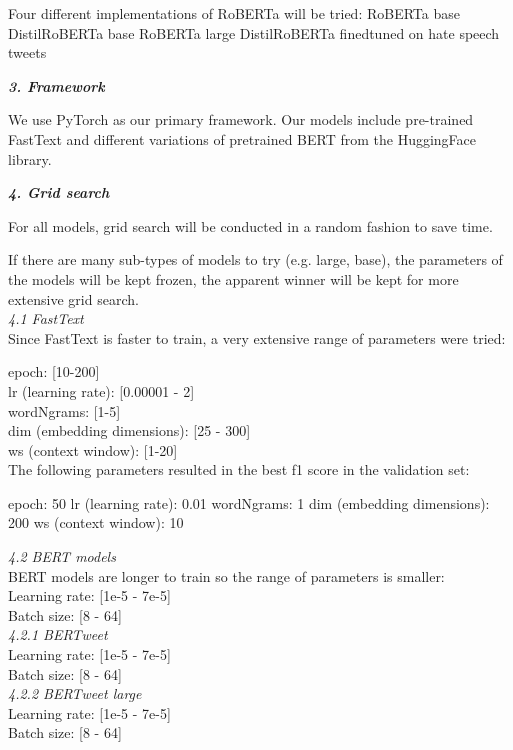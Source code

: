 \documentclass[a4paper, 10pt, conference]{IEEEtran}
\begin{document}
{{{{Four different implementations of RoBERTa will be tried:
RoBERTa base
DistilRoBERTa base
RoBERTa large
DistilRoBERTa finedtuned on hate speech tweets

\vspace{1em}
\noindent\textit{\bf 3. Framework}

We use PyTorch as our primary framework. Our models include pre-trained FastText and different variations of pretrained BERT from the HuggingFace library.

\vspace{1em}
\noindent\textit{\bf 4. Grid search}

For all models, grid search will be conducted in a random fashion to save time.

If there are many sub-types of models to try (e.g. large, base), the parameters of the models will be kept frozen, the apparent winner will be kept for more extensive grid search.
\\

\noindent\textit{4.1 FastText}\\
Since FastText is faster to train, a very extensive range of parameters were tried:

epoch: [10-200]\\
lr (learning rate): [0.00001 - 2]\\
wordNgrams: [1-5]\\
dim (embedding dimensions): [25 - 300]\\
ws (context window): [1-20]\\

The following parameters resulted in the best f1 score in the validation set:

epoch: 50
lr (learning rate): 0.01
wordNgrams: 1
dim (embedding dimensions): 200
ws (context window): 10

\noindent\textit{4.2 BERT models}\\
BERT models are longer to train so the range of parameters is smaller:\\
Learning rate: [1e-5 - 7e-5] \\
Batch size: [8 - 64]
\\

\noindent\textit{4.2.1 BERTweet}\\
Learning rate: [1e-5 - 7e-5] \\
Batch size: [8 - 64]
\\

\noindent\textit{4.2.2 BERTweet large}\\
Learning rate: [1e-5 - 7e-5] \\
Batch size: [8 - 64]
\\

}}}}
\end{document}
